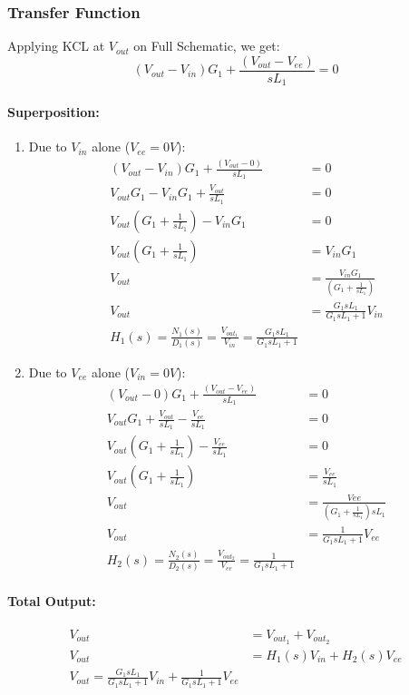 \subsubsection{Transfer Function}
Applying KCL at $V_{out}$ on Full Schematic, we get:
\[
  (V_{out} - V_{in}){G_1} + \frac{(V_{out} - V_{ee})}{sL_1} = 0
\]
\paragraph{Superposition:}
\begin{enumerate}
  \item Due to \(V_{in}\) alone (\(V_{ee} = 0V\)):
    \begin{align*}
      (V_{out} - V_{in}){G_1} + \frac{(V_{out} - 0)}{sL_1} &= 0 \\
      V_{out}G_1 - V_{in}G_1 + \frac{V_{out}}{sL_1} &= 0 \\
      V_{out}(G_1 + \frac{1}{sL_1}) - V_{in}G_1 &= 0 \\
      V_{out}(G_1 + \frac{1}{sL_1}) &= V_{in}G_1 \\
      V_{out} &= \frac{V_{in}G_1}{(G_1 + \frac{1}{sL_1})} \\
      V_{out} &= \frac{G_1 s L_1}{G_1 s L_1 + 1}V_{in} \\
      \boxed{H_1(s) = \frac{N_1(s)}{D_1(s)} = \frac{V_{out_1}}{V_{in}} = \frac{G_1 s L_1}{G_1 s L_1 + 1}}
    \end{align*}
  \item Due to \(V_{ee}\) alone (\(V_{in} = 0V\)):
    \begin{align*}
      (V_{out} - 0){G_1} + \frac{(V_{out} - V_{ee})}{sL_1} &= 0 \\
      V_{out}G_1 + \frac{V_{out}}{sL_1} - \frac{V_{ee}}{sL_1} &= 0 \\
      V_{out}(G_1 + \frac{1}{sL_1}) - \frac{V_{ee}}{sL_1} &= 0 \\
      V_{out}(G_1 + \frac{1}{sL_1}) &= \frac{V_{ee}}{sL_1} \\
      V_{out} &= \frac{Vee}{(G_1 + \frac{1}{sL_1}) sL_1} \\
      V_{out} &= \frac{1}{G_1 s L_1 + 1}V_{ee} \\
      \boxed{H_2(s) = \frac{N_2(s)}{D_2(s)} = \frac{V_{out_2}}{V_{ee}} = \frac{1}{G_1 s L_1 + 1}}
    \end{align*}
\end{enumerate}
\paragraph{Total Output:}
\begin{align*}
  V_{out} &= V_{out_1} + V_{out_2} \\
  V_{out} &= H_1(s) V_{in} + H_2(s) V_{ee} \\
  \boxed{V_{out} = \frac{G_1 s L_1}{G_1 s L_1 + 1} V_{in} + \frac{1}{G_1 s L_1 + 1} V_{ee}}
\end{align*}


